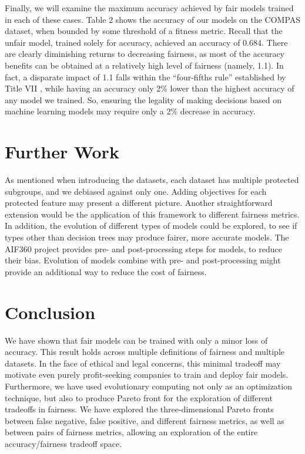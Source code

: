 \documentclass{elsarticle}
\begin{document}
Finally, we will examine the maximum accuracy achieved by fair models trained in each of these cases. Table 2 shows the accuracy of our models on the COMPAS dataset, when bounded by some threshold of a fitness metric. Recall that the unfair model, trained solely for accuracy, achieved an accuracy of 0.684. There are clearly diminishing returns to decreasing fairness, as most of the accuracy benefits can be obtained at a relatively high level of fairness (namely, 1.1). In fact, a disparate impact of 1.1 falls within the “four-fifths rule” established by Title VII \citep{Barocas:2016}, while having an accuracy only 2\% lower than the highest accuracy of any model we trained. So, ensuring the legality of making decisions based on machine learning models may require only a 2\% decrease in accuracy.

\section{Further Work}
As mentioned when introducing the datasets, each dataset has multiple protected subgroups, and we debiased against only one. Adding objectives for each protected feature may present a different picture. Another straightforward extension would be the application of this framework to different fairness metrics. In addition, the evolution of different types of models could be explored, to see if types other than decision trees may produce fairer, more accurate models. The AIF360 project provides pre- and post-processing steps for models, to reduce their bias. Evolution of models combine with pre- and post-processing might provide an additional way to reduce the cost of fairness.

\section{Conclusion}
We have shown that fair models can be trained with only a minor loss of accuracy. This result holds across multiple definitions of fairness and multiple datasets. In the face of ethical and legal concerns, this minimal tradeoff may motivate even purely profit-seeking companies to train and deploy fair models. Furthermore, we have used evolutionary computing not only as an optimization technique, but also to produce Pareto front for the exploration of different tradeoffs in fairness. We have explored the three-dimensional Pareto fronts between false negative, false positive, and different fairness metrics, as well as between pairs of fairness metrics, allowing an exploration of the entire accuracy/fairness tradeoff space.
 
\end{document}

